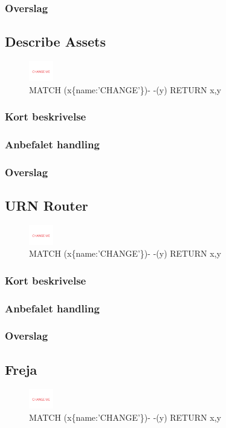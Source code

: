 \documentclass{article}
\begin{document}
\subsubsection{Overslag}


\subsection{Describe Assets}
\begin{figure}[h]
\includegraphics[width=30pt]{CHANGE.PNG}
\caption{MATCH (x\{name:'CHANGE'\})- -(y) RETURN x,y}
\end{figure}
\subsubsection{Kort beskrivelse}
\subsubsection{Anbefalet handling}
\subsubsection{Overslag}


\subsection{URN Router}
\begin{figure}[h]
\includegraphics[width=30pt]{CHANGE.PNG}
\caption{MATCH (x\{name:'CHANGE'\})- -(y) RETURN x,y}
\end{figure}
\subsubsection{Kort beskrivelse}
\subsubsection{Anbefalet handling}
\subsubsection{Overslag}


\subsection{Freja}
\begin{figure}[h]
\includegraphics[width=30pt]{CHANGE.PNG}
\caption{MATCH (x\{name:'CHANGE'\})- -(y) RETURN x,y}
\end{figure}
\end{document}

